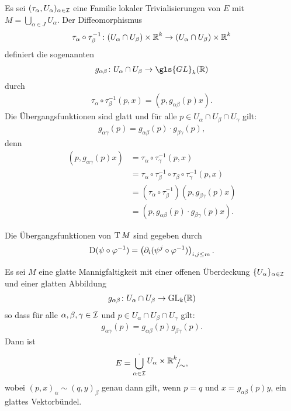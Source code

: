 Es sei $(\tau_\alpha,U_{\alpha})_{\alpha \in \operatorname{\mathcal{I}}}$ eine Familie lokaler Trivialisierungen von $E$ mit $M = \bigcup_{\alpha \in J}U_{\alpha}$.
Der Diffeomorphismus
\begin{align*}
  \tau_{\alpha} \circ \tau_{\beta}^{-1}\colon (U_{\alpha} \cap U_{\beta}) \times \operatorname{\mathbb{R}}^k \to (U_{\alpha} \cap U_{\beta}) \times \operatorname{\mathbb{R}}^k
\end{align*}
definiert die sogenannten 
\begin{align*}
  g_{\alpha\beta} \colon U_{\alpha} \cap U_{\beta} \to \gls{GL}_k(\R)
\end{align*}
durch 
\begin{align*}
  \tau_{\alpha} \circ \tau_{\beta}^{-1}(p,x) = (p,g_{\alpha\beta}(p) x).
\end{align*}
Die Übergangsfunktionen sind glatt und für alle $p \in U_{\alpha} \cap U_{\beta} \cap U_{\gamma}$ gilt:
\begin{align*}
  g_{\alpha\gamma}(p) = g_{\alpha\beta}(p) \cdot g_{\beta\gamma}(p),
\end{align*}
denn
\begin{align*}
	(p,g_{\alpha\gamma}(p)x) & = \tau_{\alpha} \circ \tau_{\gamma}^{-1}(p,x)\\
	& = \tau_{\alpha} \circ \tau_{\beta}^{-1} \circ \tau_{\beta} \circ \tau_{\gamma}^{-1}(p,x)\\
	& = (\tau_{\alpha} \circ \tau_{\beta}^{-1})(p,g_{\beta\gamma}(p)x)\\
	& = (p,g_{\alpha\beta}(p)\cdot g_{\beta\gamma}(p)x).
\end{align*}

\begin{bsp}
  Die Übergangsfunktionen von $\operatorname{T} M$ sind gegeben durch
  \begin{align*}
    \operatorname{D}(\psi \circ \varphi^{-1}) = \left(\partial_i(\psi^j \circ \varphi^{-1})\right)_{i,j \leq m}.
  \end{align*}
\end{bsp}

\begin{Satz}
  Es sei $M$ eine glatte Mannigfaltigkeit mit einer offenen Überdeckung $\{U_{\alpha}\}_{\alpha \in \operatorname{\mathcal{I}}}$ und einer glatten Abbildung
  \begin{align*}
    g_{\alpha\beta} \colon U_{\alpha} \cap U_{\beta} \to \operatorname{GL}_k(\operatorname{\mathbb{R}})
  \end{align*}
so dass für alle $\alpha,\beta,\gamma \in \operatorname{\mathcal{I}}$ und $p \in U_{\alpha} \cap U_{\beta} \cap U_{\gamma}$ gilt:
\begin{align*}
  g_{\alpha\gamma} (p) = g_{\alpha\beta}(p)g_{\beta\gamma}(p).
\end{align*}
Dann ist
	\[ E = \bigcup_{\alpha \in \calI}^{\cdot} \FakRaum{U_{\alpha} \times \R^k}{\sim}, \]
wobei $(p,x)_{\alpha} \sim (q,y)_{\beta}$ genau dann gilt, wenn $p = q$ und $x = g_{\alpha\beta}(p)y$, ein glattes Vektorbündel.
\end{Satz}

